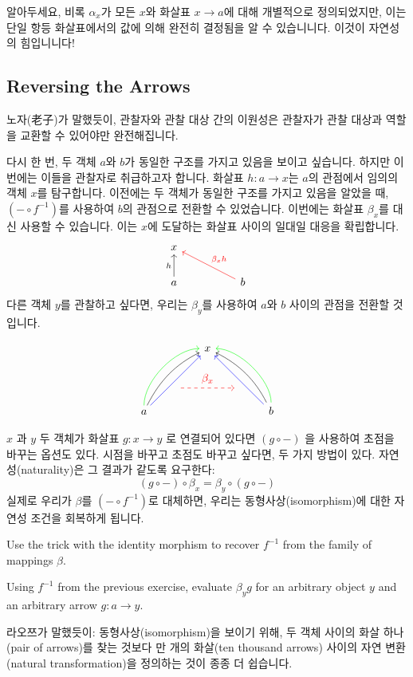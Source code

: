 \documentclass[DaoFP]{subfiles}
\begin{document}
알아두세요, 비록 $\alpha_x$가 모든 $x$와 화살표 $x \to a$에 대해 개별적으로 정의되었지만, 이는 단일 항등 화살표에서의 값에 의해 완전히 결정됨을 알 수 있습니니다. 이것이 자연성의 힘입니니다!
\subsection{Reversing the Arrows}
노자(老子)가 말했듯이, 관찰자와 관찰 대상 간의 이원성은 관찰자가 관찰 대상과 역할을 교환할 수 있어야만 완전해집니다.

다시 한 번, 두 객체 $a$와 $b$가 동일한 구조를 가지고 있음을 보이고 싶습니다. 하지만 이번에는 이들을 관찰자로 취급하고자 합니다. 화살표 $h \colon a \to x$는 $a$의 관점에서 임의의 객체 $x$를 탐구합니다. 이전에는 두 객체가 동일한 구조를 가지고 있음을 알았을 때, $(- \circ f^{-1})$를 사용하여 $b$의 관점으로 전환할 수 있었습니다. 이번에는 화살표 $\beta_x$를 대신 사용할 수 있습니다. 이는 $x$에 도달하는 화살표 사이의 일대일 대응을 확립합니다.
\[
 \begin{tikzcd}
 x
 \\
 a
\arrow[u, "h"]
 && b
  \arrow[llu, red, "\beta_x h"']
  \end{tikzcd}
\]
다른 객체 $y$를 관찰하고 싶다면, 우리는 $\beta_y$를 사용하여 $a$와 $b$ 사이의 관점을 전환할 것입니다.

\[
 \begin{tikzcd}
 \node(x) at (0, 2) {x};
 \node(a) at (-2, 0) {a};
 \node(b) at (2, 0) {b};
 \node(c1) at (-1, 1.5) {};
 \node(c2) at (-1.5, 1) {};
 \node(c3) at (-1, 2) {};
 \node(c4) at (-2, 1) {};
 \node(d1) at (1, 1.5) {};
 \node(d2) at (1.5, 1) {};
 \node(d3) at (1, 2) {};
 \node(d4) at (2, 1) {};
\node (aa) at (-1, 0.75) {};
 \node (bb) at (1, 0.75) {};
 \draw[<-] (x) .. controls (c1)  and (c2) .. (a); %
 \draw[<-, green] (x) .. controls (c3)  and (c4) .. (a); %
 \draw[<-, blue] (x) -- (a); 
  \draw[<-] (x) .. controls (d1)  and (d2) .. (b); %
 \draw[<-, green] (x) .. controls (d3)  and (d4) .. (b); %
 \draw[<-, blue] (x) -- (b); 
 \draw[->, red, dashed] (aa) -- node[above]{\beta_x} (bb);
 \end{tikzcd}
\]


$x$ 과 $y$ 두 객체가 화살표 $g \colon x \to y$ 로 연결되어 있다면 $(g \circ -)$ 을 사용하여 초점을 바꾸는 옵션도 있다. 시점을 바꾸고 초점도 바꾸고 싶다면, 두 가지 방법이 있다. 자연성(naturality)은 그 결과가 같도록 요구한다:
\[ (g \circ -) \circ \beta_x = \beta_y \circ (g \circ -) \]
실제로 우리가 $\beta$를 $(- \circ f^{-1})$로 대체하면, 우리는 동형사상(isomorphism)에 대한 자연성 조건을 회복하게 됩니다.

\begin{exercise}
Use the trick with the identity morphism to recover $f^{-1}$ from the family of mappings $\beta$.
\end{exercise}
\begin{exercise}
Using $f^{-1}$ from the previous exercise, evaluate $\beta_y g$ for an arbitrary object $y$ and an arbitrary arrow $g \colon a \to y$.
\end{exercise}


라오쯔가 말했듯이: 동형사상(isomorphism)을 보이기 위해, 두 객체 사이의 화살 하나(pair of arrows)를 찾는 것보다 만 개의 화살(ten thousand arrows) 사이의 자연 변환(natural transformation)을 정의하는 것이 종종 더 쉽습니다.
\end{document}
